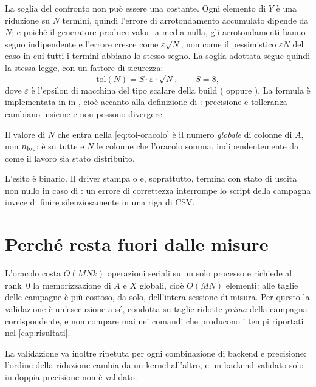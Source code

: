 La soglia del confronto non può essere una costante. Ogni elemento di $Y$ è una
riduzione su $N$ termini, quindi l'errore di arrotondamento accumulato dipende
da $N$; e poiché il generatore produce valori a media nulla, gli arrotondamenti
hanno segno indipendente e l'errore cresce come $\varepsilon\sqrt{N}$, non come
il pessimistico $\varepsilon N$ del caso in cui tutti i termini abbiano lo
stesso segno. La soglia adottata segue quindi la stessa legge, con un fattore
di sicurezza:
\begin{equation}
  \mathrm{tol}(N) = S \cdot \varepsilon \cdot \sqrt{N},
  \qquad S = 8,
  \label{eq:tol-oracolo}
\end{equation}
dove $\varepsilon$ è l'epsilon di macchina del tipo scalare della build
( oppure ). La formula è implementata in
 in , cioè accanto alla
definizione di : precisione e tolleranza cambiano insieme e non
possono divergere.

Il valore di $N$ che entra nella \cref{eq:tol-oracolo} è il numero
\emph{globale} di colonne di $A$, non $n_{\text{loc}}$: è su tutte e $N$ le colonne che
l'oracolo somma, indipendentemente da come il lavoro sia stato distribuito.

L'esito è binario. Il driver stampa  o  e, soprattutto,
termina con stato di uscita non nullo in caso di : un errore di
correttezza interrompe lo script della campagna invece di finire silenziosamente
in una riga di CSV.

\section{Perché resta fuori dalle misure}
\label{sec:oracolo-costo}

L'oracolo costa $O(MNk)$ operazioni seriali su un solo processo e richiede al
rank~0 la memorizzazione di $A$ e $X$ globali, cioè $O(MN)$ elementi: alle
taglie delle campagne è più costoso, da solo, dell'intera sessione di misura.
Per questo la validazione è un'esecuzione a sé, condotta su taglie ridotte
\emph{prima} della campagna corrispondente, e  non compare mai
nei comandi che producono i tempi riportati nel \cref{cap:risultati}.

La validazione va inoltre ripetuta per ogni combinazione di backend e
precisione: l'ordine della riduzione cambia da un kernel all'altro, e un
backend validato solo in doppia precisione non è validato.
